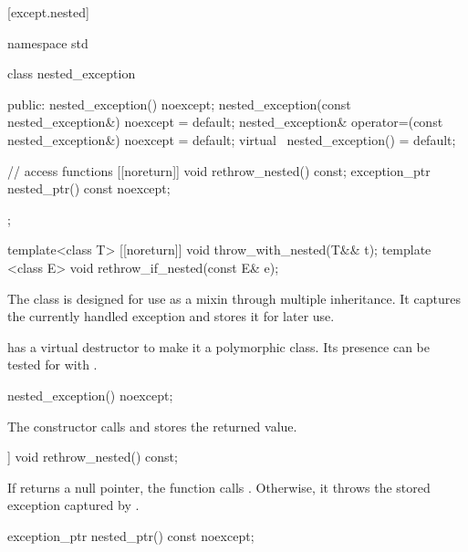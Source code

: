 [except.nested]{}

%
\begin{codeblock}
namespace std {
  class nested_exception {
  public:
    nested_exception() noexcept;
    nested_exception(const nested_exception&) noexcept = default;
    nested_exception& operator=(const nested_exception&) noexcept = default;
    virtual ~nested_exception() = default;

    // access functions
    [[noreturn]] void rethrow_nested() const;
    exception_ptr nested_ptr() const noexcept;
  };

  template<class T> [[noreturn]] void throw_with_nested(T&& t);
  template <class E> void rethrow_if_nested(const E& e);
}
\end{codeblock}

\pnum
The class  is designed for use as a mixin through
multiple inheritance. It captures the currently handled exception and stores it
for later use.

\pnum
\begin{note}  has a virtual destructor to make it a
polymorphic class. Its presence can be tested for with .
\end{note}

\begin{itemdecl}
nested_exception() noexcept;
\end{itemdecl}

\begin{itemdescr}
\pnum
\effects The constructor calls  and stores the returned value.
\end{itemdescr}

\begin{itemdecl}
[[noreturn]] void rethrow_nested() const;
\end{itemdecl}

\begin{itemdescr}
\pnum
\effects If  returns a null pointer, the function calls .
Otherwise, it throws the stored exception captured by .
\end{itemdescr}

\begin{itemdecl}
exception_ptr nested_ptr() const noexcept;
\end{itemdecl}

